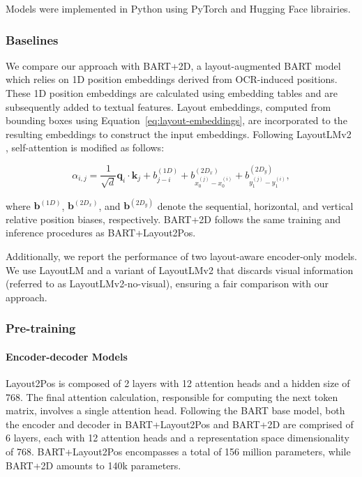 Models were implemented in Python using PyTorch \citep{paszke2017automatic} and Hugging Face \citep{wolf2019huggingface} librairies. 

\subsubsection{Baselines}

We compare our approach with BART+2D, a layout-augmented \ac{BART} model which relies on 1D position embeddings derived from \ac{OCR}-induced positions. These 1D position embeddings are calculated using embedding tables and are subsequently added to textual features. Layout embeddings, computed from bounding boxes using Equation~\ref{eq:layout-embeddings}, are incorporated to the resulting embeddings to construct the input embeddings. Following LayoutLMv2 \citep{xu2020layoutlmv2}, self-attention is modified as follows: 

\begin{equation}
  \alpha_{i,j} = \dfrac{1}{\sqrt{d}} \bm{q}_i \cdot \bm{k}_j + b^{(1D)}_{j - i} + b^{(2D_x)}_{x^{(j)}_{0} - x^{(i)}_{0}} + b^{(2D_y)}_{y^{(j)}_{1} - y^{(i)}_{1}},
\end{equation}

\noindent where $\bm{b}^{(1D)}$, $\bm{b}^{(2D_x)}$, and $\bm{b}^{(2D_y)}$ denote the sequential, horizontal, and vertical relative position biases, respectively. BART+2D follows the same training and inference procedures as BART+Layout2Pos.

Additionally, we report the performance of two layout-aware encoder-only models. We use LayoutLM and a variant of LayoutLMv2 that discards visual information (referred to as LayoutLMv2-no-visual), ensuring a fair comparison with our approach. 

\subsubsection{Pre-training}

\paragraph{Encoder-decoder Models} Layout2Pos is composed of 2 layers with 12 attention heads and a hidden size of 768. The final attention calculation, responsible for computing the next token matrix, involves a single attention head. Following the \ac{BART} base model, both the encoder and decoder in BART+Layout2Pos and BART+2D are comprised of 6 layers, each with 12 attention heads and a representation space dimensionality of 768. BART+Layout2Pos encompasses a total of 156 million parameters, while BART+2D amounts to 140k parameters. 

